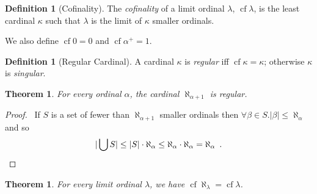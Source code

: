 \documentclass{article}
\let\qed\relax
\newtheorem{theorem}[axiom]{Theorem}
\theoremstyle{definition}
\newtheorem{definition}[axiom]{Definition}
\newcommand{\cf}{\ensuremath{\operatorname{cf}}}
\begin{document}
    \begin{definition}[Cofinality]
        The \emph{cofinality} of a limit ordinal $\lambda$, $\cf \lambda$, is the least cardinal $\kappa$
        such that $\lambda$
        is the limit of $\kappa$ smaller ordinals.

        We also define $\cf 0 = 0$ and $\cf \alpha^+ = 1$.
    \end{definition}

    \begin{definition}[Regular Cardinal]
        A cardinal $\kappa$ is \emph{regular} iff $\cf \kappa = \kappa$; otherwise $\kappa$ is
        \emph{singular}.
    \end{definition}

    \begin{theorem}
        For every ordinal $\alpha$, the cardinal $\aleph_{\alpha + 1}$ is regular.
    \end{theorem}

    \begin{proof}
        \pf\ If $S$ is a set of fewer than $\aleph_{\alpha + 1}$ smaller ordinals then
        $\forall \beta \in S. |\beta| \leq \aleph_\alpha$ and so
        \[ |\bigcup S| \leq |S| \cdot \aleph_\alpha \leq \aleph_\alpha \cdot \aleph_\alpha = \aleph_\alpha
        \enspace . \qed \]
    \end{proof}

    \begin{theorem}
        For every limit ordinal $\lambda$, we have $\cf \aleph_\lambda = \cf \lambda$.
    \end{theorem}
\end{document}
